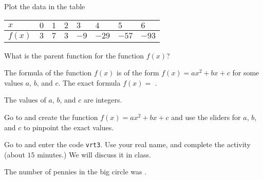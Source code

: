 \documentclass{ximera}
\begin{document}
\begin{question}
Plot the data in the table
\begin{center}
\begin{tabular}{llllllll}
    $x$  & $0$ & $1$ & $2$ & $3$  & $4$   & $5$    & $6$   \\ \hline
    $f(x)$ & $3$ & $7$ & $3$ & $-9$ & $-29$ & $-57$ & $-93$ \\
\end{tabular}
\end{center} 
What is the parent function for the function $f(x)$?

\begin{multipleChoice}
\end{multipleChoice}
The formula of the function $f(x)$ is of the form $f(x)=ax^2+bx+c$ for some values $a$, $b$, and $c$. The exact formula $f(x)=$ .
\begin{hint}
The values of $a$, $b$, and $c$ are integers.
\end{hint}

\begin{hint}
Go to  and create the function $f(x)=ax^2+bx+c$ and use the sliders for $a$, $b$, and $c$ to pinpoint the exact values.
\end{hint}

\end{question}




\begin{question}
Go to  and enter the code \verb|vrt3|. Use your real name, and complete the activity (about $15$ minutes.) We will discuss it in class.

The number of pennies in the big circle was .

\end{question}
\end{document}
